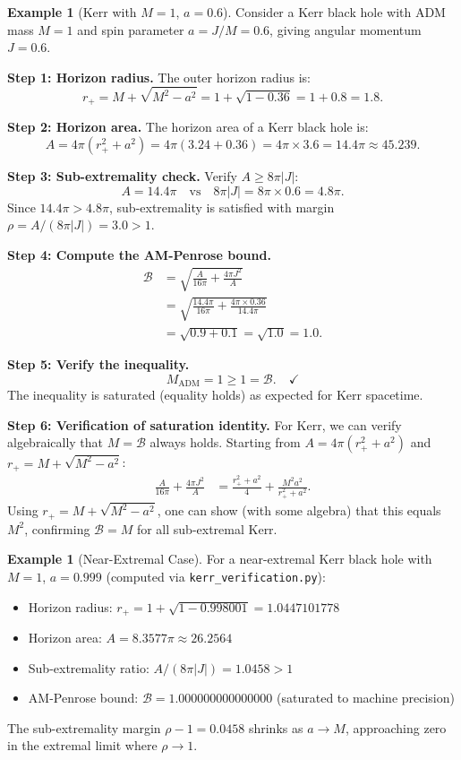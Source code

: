 \documentclass[12pt]{article}
\theoremstyle{plain}
\theoremstyle{definition}
\newtheorem{example}[theorem]{Example}
\theoremstyle{remark}
\newcommand{\ADM}{\mathrm{ADM}}
\begin{document}
\begin{example}[Kerr with $M = 1$, $a = 0.6$]\label{ex:kerr-numeric}
Consider a Kerr black hole with ADM mass $M = 1$ and spin parameter $a = J/M = 0.6$, giving angular momentum $J = 0.6$.

\textbf{Step 1: Horizon radius.}
The outer horizon radius is:
\[
r_+ = M + \sqrt{M^2 - a^2} = 1 + \sqrt{1 - 0.36} = 1 + 0.8 = 1.8.
\]

\textbf{Step 2: Horizon area.}
The horizon area of a Kerr black hole is:
\[
A = 4\pi(r_+^2 + a^2) = 4\pi(3.24 + 0.36) = 4\pi \times 3.6 = 14.4\pi \approx 45.239.
\]

\textbf{Step 3: Sub-extremality check.}
Verify $A \geq 8\pi|J|$:
\[
A = 14.4\pi \quad \text{vs} \quad 8\pi|J| = 8\pi \times 0.6 = 4.8\pi.
\]
Since $14.4\pi > 4.8\pi$, sub-extremality is satisfied with margin $\rho = A/(8\pi|J|) = 3.0 > 1$. \checkmark

\textbf{Step 4: Compute the AM-Penrose bound.}
\begin{align*}
\mathcal{B} &= \sqrt{\frac{A}{16\pi} + \frac{4\pi J^2}{A}} \\
&= \sqrt{\frac{14.4\pi}{16\pi} + \frac{4\pi \times 0.36}{14.4\pi}} \\
&= \sqrt{0.9 + 0.1} = \sqrt{1.0} = 1.0.
\end{align*}

\textbf{Step 5: Verify the inequality.}
\[
M_{\ADM} = 1 \geq 1 = \mathcal{B}. \quad \checkmark
\]
The inequality is saturated (equality holds) as expected for Kerr spacetime.

\textbf{Step 6: Verification of saturation identity.}
For Kerr, we can verify algebraically that $M = \mathcal{B}$ always holds. Starting from $A = 4\pi(r_+^2 + a^2)$ and $r_+ = M + \sqrt{M^2 - a^2}$:
\begin{align*}
\frac{A}{16\pi} + \frac{4\pi J^2}{A} &= \frac{r_+^2 + a^2}{4} + \frac{M^2 a^2}{r_+^2 + a^2}.
\end{align*}
Using $r_+ = M + \sqrt{M^2 - a^2}$, one can show (with some algebra) that this equals $M^2$, confirming $\mathcal{B} = M$ for all sub-extremal Kerr.
\end{example}

\begin{example}[Near-Extremal Case]\label{ex:near-extremal}
For a near-extremal Kerr black hole with $M = 1$, $a = 0.999$ (computed via \texttt{kerr\_verification.py}):
\begin{itemize}
    \item Horizon radius: $r_+ = 1 + \sqrt{1 - 0.998001} = 1.0447101778$
    \item Horizon area: $A = 8.3577\pi \approx 26.2564$
    \item Sub-extremality ratio: $A/(8\pi|J|) = 1.0458 > 1$ \checkmark
    \item AM-Penrose bound: $\mathcal{B} = 1.000000000000000$ (saturated to machine precision)
\end{itemize}
The sub-extremality margin $\rho - 1 = 0.0458$ shrinks as $a \to M$, approaching zero in the extremal limit where $\rho \to 1$.
\end{example}
\end{document}
